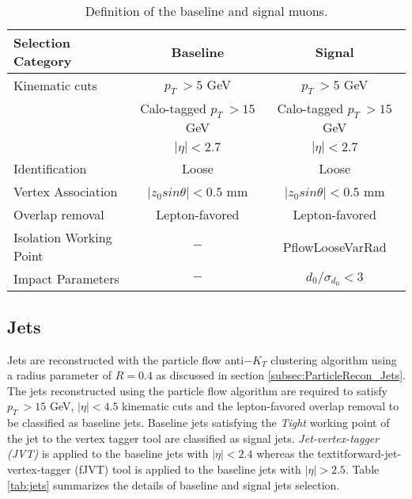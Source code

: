 \begin{table}[ht]
	\centering
		\caption{Definition of the baseline and signal muons.\label{tab:muon_baseline_signal}}
		\begin{tabular}{|| l || c | c ||}
		\hline
		Selection Category & \textbf{Baseline} & \textbf{Signal} \\
		\hline\hline
		Kinematic cuts & $p_{T}~ > 5$ GeV & $p_{T}~ > 5$ GeV \\
					& Calo-tagged $ p_{T}~ > 15$ GeV & Calo-tagged $ p_{T}~ > 15$ GeV \\
		      & $|\eta| < 2.7$ & $|\eta| < 2.7$\\
		\hline
		Identification & Loose & Loose \\
		\hline 
		Vertex Association & $|z_{0}sin\theta| < 0.5$ mm & $|z_{0}sin\theta|< 0.5$ mm\\
		\hline
		Overlap removal & Lepton-favored & Lepton-favored\\
		\hline
		Isolation Working Point & $-$ & PflowLooseVarRad\\
		\hline 
		Impact Parameters & $-$ & $d_{0}/\sigma_{d_{0}} < 3$ \\
		\hline
	\end{tabular}
\end{table}

\subsection{Jets}
\label{subsec:JetRecon}
Jets are reconstructed with the particle flow anti$-K_{T}$ clustering algorithm using a radius parameter of $R = 0.4$ as discussed in section \ref{subsec:ParticleRecon_Jets}. The jets reconstructed using the particle flow algorithm are required to satisfy $p_{T}~ > 15$ GeV, $ |\eta| < 4.5 $ kinematic cuts and the lepton-favored overlap removal to be classified as baseline jets. Baseline jets satisfying the \textit{Tight} working point of the jet to the vertex tagger tool are classified as signal jets. \textit{Jet-vertex-tagger (JVT)} is applied to the baseline jets with $ |\eta| < 2.4 $ whereas the textit{forward-jet-vertex-tagger (fJVT)} tool is applied to the baseline jets with $ |\eta| > 2.5 $. Table \ref{tab:jets} summarizes the details of baseline and signal jets selection. 

